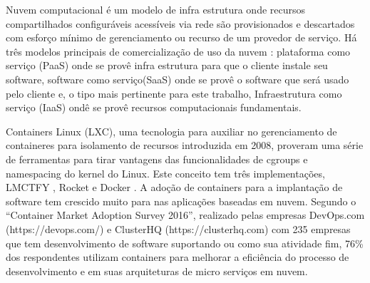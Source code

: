\documentclass[conference]{IEEEtran}
\newcommand{\marcos}[1]{{\color{blue}{MARCOS: #1}}}
\begin{document}
\marcos{Discutir a importância da nuvem faz mais sentido na Introdução, no ``Contexto Geral''. Se o leitor chegou até aqui, ou ele está convencido da importância da nuvem (=seu contexto geral) e não é necessário lembrá-lo, ou ele parou de ler lá atrás, por não ter gostado do seu contexto geral... Informações sobre modelos de nuvem (deixando claro seu foco em IaaS) e containeres são interessantes de incluir no documento, mas não acho que condizem com o título da seção... SUGESTÃO: Renomeie a seção para ``Fundamentação Teórica'' e explique nela, com sub-seções sucintas, os principais conceitos que interessam para o seu trabalho. NOTA: Isso normalmente é a última seção que se escreve, pois só no final você vai saber todos os conceitos necessários para o seu documento}

Nuvem computacional é um modelo de infra estrutura onde recursos compartilhados configuráveis acessíveis via rede são provisionados e descartados com esforço mínimo de gerenciamento ou recurso de um provedor de serviço. \cite{NIST2011}
%
Há três modelos principais de comercialização de uso da nuvem \cite{NIST2011}: plataforma como serviço (PaaS) onde se provê infra estrutura para que o cliente instale seu software, software como serviço(SaaS) onde se provê o software que será usado pelo cliente e, o tipo mais pertinente para este trabalho, Infraestrutura como serviço (IaaS) ondê se provê recursos computacionais fundamentais.


Containers Linux (LXC), uma tecnologia para auxiliar no gerenciamento de containeres para isolamento de recursos \marcos{Aliás, acho que o termo correto em português é ``contêiner'', não? - HAMILTON: o dicionário tem as 2 grafias} introduzida em 2008, proveram uma série de ferramentas para tirar vantagens das funcionalidades de cgroups e namespacing do kernel do Linux. 
%
Este conceito tem três implementações, LMCTFY \marcos{REFERÊNCIA}, Rocket \marcos{REFERÊNCIA} e Docker \marcos{REFERÊNCIA}. 
%
A adoção de containers para a implantação de software tem crescido muito para nas aplicações baseadas em nuvem. Segundo o ``Container Market Adoption Survey 2016'', realizado pelas empresas DevOps.com (https://devops.com/) e ClusterHQ (https://clusterhq.com) com 235 empresas que tem desenvolvimento de software suportando ou como sua atividade fim, 76\% dos respondentes utilizam containers para melhorar a eficiência do processo de desenvolvimento e em suas arquiteturas de micro serviços em nuvem.
\end{document}
